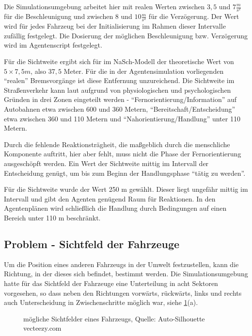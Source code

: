 Die Simulationsumgebung arbeitet hier mit realen Werten zwischen $3,5$ und $7 \frac{m}{s^{2}}$ für die Beschleunigung und zwischen $8$ und $10 \frac{m}{s^{2}}$ für die Verzögerung.
Der Wert wird für jedes Fahrzeug bei der Initialisierung im Rahmen dieser Intervalle zufällig festgelegt.
Die Dosierung der möglichen Beschleunigung bzw. Verzögerung wird im Agentenscript festgelegt.

Für die Sichtweite ergibt sich für im NaSch-Modell der theoretische Wert von $5 \times 7,5 m$, also $37,5$ Meter.
Für die in der Agentensimulation vorliegenden \enquote{realen} Bremsvorgänge ist diese Entfernung unzureichend. 
Die Sichtweite im Straßenverkehr kann laut \cite{sichtweite} aufgrund von physiologischen und psychologischen Gründen in drei Zonen eingeteilt werden - \enquote{Fernorientierung/Information} auf Autobahnen etwa zwischen 600 und 360 Metern, \enquote{Bereitschaft/Entscheidung} etwa zwischen 360 und 110 Metern und \enquote{Nahorientierung/Handlung} unter 110 Metern.

Durch die fehlende Reaktionsträgheit, die maßgeblich durch die menschliche Komponente auftritt, hier aber fehlt, muss nicht die Phase der Fernorientierung ausgeschöpft werden. 
Ein Wert der Sichtweite mittig im Intervall der Entscheidung genügt, um bis zum Beginn der Handlungsphase \enquote{tätig zu werden}.

Für die Sichtweite wurde der Wert 250 m gewählt.
Dieser liegt ungefähr mittig im Intervall und gibt den Agenten genügend Raum für Reaktionen. 
In den Agentenplänen wird schließlich die Handlung durch Bedingungen auf einen Bereich unter 110 m beschränkt.



\subsection{Problem - Sichtfeld der Fahrzeuge}

Um die Position eines anderen Fahrzeugs in der Umwelt festzustellen, kann die Richtung, in der dieses sich befindet, bestimmt werden.
Die Simulationsumgebung hatte für das Sichtfeld der Fahrzeuge eine Unterteilung in acht Sektoren vorgesehen, so dass neben den Richtungen vorwärts, rückwärts, links und rechts auch Unterscheidung in Zwischenschritte möglich war, siehe \cref{figure:car-view-sectors}(a).

\begin{figure}[hptb]
  \centering 
   \qquad 
   \qquad 
  \caption{mögliche Sichtfelder eines Fahrzeugs, Quelle: Auto-Silhouette vecteezy.com} 
  \label{figure:car-view-sectors}
\end{figure}

